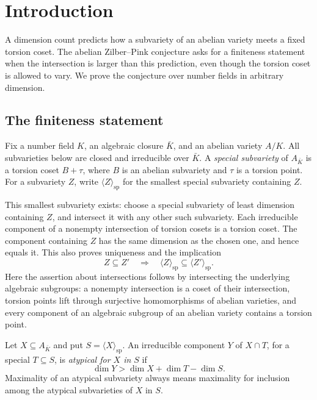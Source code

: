 \section{Introduction}\label{sec:introduction}

A dimension count predicts how a subvariety of an abelian variety
meets a fixed torsion coset. The abelian Zilber--Pink conjecture asks
for a finiteness statement when the intersection is larger than this
prediction, even though the torsion coset is allowed to vary. We prove
the conjecture over number fields in arbitrary dimension.

\subsection{The finiteness statement}
Fix a number field $K$, an algebraic closure $\bar K$, and an abelian
variety $A/K$. All subvarieties below are closed and irreducible over
$\bar K$. A \emph{special subvariety} of $A_{\bar K}$ is a torsion coset
$B+\tau$, where $B$ is an abelian subvariety and $\tau$ is a torsion
point. For a subvariety $Z$, write $\langle Z\rangle_{\mathrm{sp}}$ for
the smallest special subvariety containing $Z$.

This smallest subvariety exists: choose a special subvariety of least
dimension containing $Z$, and intersect it with any other such
subvariety. Each irreducible component of a nonempty intersection of
torsion cosets is a torsion coset. The component containing $Z$ has the
same dimension as the chosen one, and hence equals it. This also proves
uniqueness and the implication
\begin{equation}\label{eq:closure-monotonicity}
 Z\subseteq Z'\quad\Longrightarrow\quad
 \langle Z\rangle_{\mathrm{sp}}\subseteq
 \langle Z'\rangle_{\mathrm{sp}}.
\end{equation}
Here the assertion about intersections follows by intersecting the
underlying algebraic subgroups: a nonempty intersection is a coset of
their intersection, torsion points lift through surjective homomorphisms of abelian
varieties, and every component of an algebraic subgroup of an abelian
variety contains a torsion point.

Let $X\subseteq A_{\bar K}$ and put $S=\langle X\rangle_{\mathrm{sp}}$.
An irreducible component $Y$ of $X\cap T$, for a special $T\subseteq S$,
is \emph{atypical for $X$ in $S$} if
\begin{equation}\label{eq:atypical}
 \dim Y>\dim X+\dim T-\dim S.
\end{equation}
Maximality of an atypical subvariety always means maximality for
inclusion among the atypical subvarieties of $X$ in $S$.

